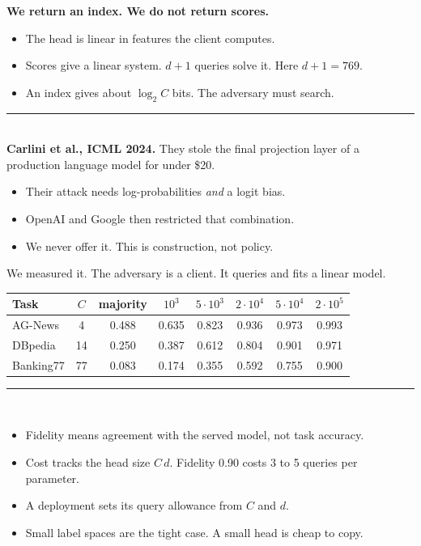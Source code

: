\documentclass[aspectratio=169,11pt]{beamer}
\newcommand{\redline}{\textcolor{kred}{\rule{\textwidth}{1pt}}}
\begin{document}
\begin{frame}
  \textbf{We return an index. We do not return scores.}
  \vspace{0.8em}
  \begin{itemize}
    \item The head is linear in features the client computes.
    \item Scores give a linear system. $d+1$ queries solve it. Here $d+1=769$.
    \item An index gives about $\log_2 C$ bits. The adversary must search.
  \end{itemize}
  \vspace{1em}
  \redline\\[0.6em]
  \textbf{Carlini et al., ICML 2024.} They stole the final projection layer of a
  production language model for under \$20.
  \begin{itemize}
    \item Their attack needs log-probabilities \emph{and} a logit bias.
    \item OpenAI and Google then restricted that combination.
    \item \alert{We never offer it. This is construction, not policy.}
  \end{itemize}
\end{frame}

\begin{frame}
  We measured it. The adversary is a client. It queries and fits a linear model.
  \vspace{0.5em}
  \begin{center}
  \footnotesize
  \begin{tabular}{lccccccc}
    \toprule
    Task & $C$ & majority & $10^3$ & $5\!\cdot\!10^3$ & $2\!\cdot\!10^4$ & $5\!\cdot\!10^4$ & $2\!\cdot\!10^5$\\
    \midrule
    AG-News   & 4  & 0.488 & 0.635 & 0.823 & 0.936 & 0.973 & 0.993\\
    DBpedia   & 14 & 0.250 & 0.387 & 0.612 & 0.804 & 0.901 & 0.971\\
    Banking77 & 77 & 0.083 & 0.174 & 0.355 & 0.592 & 0.755 & 0.900\\
    \bottomrule
  \end{tabular}
  \end{center}
  \vspace{0.6em}
  \redline\\[0.6em]
  \begin{itemize}
    \item Fidelity means agreement with the served model, not task accuracy.
    \item Cost tracks the head size $C\,d$. Fidelity 0.90 costs 3 to 5 queries per parameter.
    \item \alert{A deployment sets its query allowance from $C$ and $d$.}
    \item Small label spaces are the tight case. A small head is cheap to copy.
  \end{itemize}
\end{frame}
\end{document}

